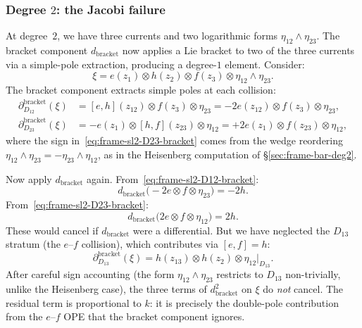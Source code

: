 \subsubsection*{Degree $2$: the Jacobi failure}

At degree~$2$, we have three currents and two logarithmic forms
$\eta_{12} \wedge \eta_{23}$. The bracket component
$d_{\mathrm{bracket}}$ now applies a Lie bracket to two of the
three currents via a simple-pole extraction, producing a degree-$1$
element. Consider:
\begin{equation}\label{eq:frame-sl2-deg2-element}
\xi = e(z_1) \otimes h(z_2) \otimes f(z_3)
 \otimes \eta_{12} \wedge \eta_{23}.
\end{equation}
The bracket component extracts simple poles at each collision:
\begin{align}
\partial_{D_{12}}^{\mathrm{bracket}}(\xi)
 &= [e, h](z_{12}) \otimes f(z_3) \otimes \eta_{23}
 = -2e(z_{12}) \otimes f(z_3) \otimes \eta_{23},
\label{eq:frame-sl2-D12-bracket} \\
\partial_{D_{23}}^{\mathrm{bracket}}(\xi)
 &= -e(z_1) \otimes [h, f](z_{23}) \otimes \eta_{12}
 = +2e(z_1) \otimes f(z_{23}) \otimes \eta_{12},
\label{eq:frame-sl2-D23-bracket}
\end{align}
where the sign in~\eqref{eq:frame-sl2-D23-bracket} comes from the
wedge reordering $\eta_{12} \wedge \eta_{23}
= -\eta_{23} \wedge \eta_{12}$, as in the Heisenberg computation
of \S\ref{sec:frame-bar-deg2}.

Now apply $d_{\mathrm{bracket}}$ again. From~\eqref{eq:frame-sl2-D12-bracket}:
\[
d_{\mathrm{bracket}}\bigl(-2e \otimes f \otimes \eta_{23}\bigr)
= -2h.
\]
From~\eqref{eq:frame-sl2-D23-bracket}:
\[
d_{\mathrm{bracket}}\bigl(2e \otimes f \otimes \eta_{12}\bigr)
= 2h.
\]
These would cancel if $d_{\mathrm{bracket}}$ were a differential.
But we have neglected the $D_{13}$ stratum (the $e$--$f$ collision),
which contributes via $[e, f] = h$:
\begin{equation}\label{eq:frame-sl2-D13-bracket}
\partial_{D_{13}}^{\mathrm{bracket}}(\xi)
= h(z_{13}) \otimes h(z_2) \otimes \eta_{12}|_{D_{13}}.
\end{equation}
After careful sign accounting (the form $\eta_{12}\wedge\eta_{23}$
restricts to $D_{13}$ non-trivially, unlike the Heisenberg case),
the three terms of $d_{\mathrm{bracket}}^2$ on $\xi$ do \emph{not}
cancel. The residual term is proportional to $k$: it is precisely
the double-pole contribution from the $e$--$f$ OPE that the
bracket component ignores.

